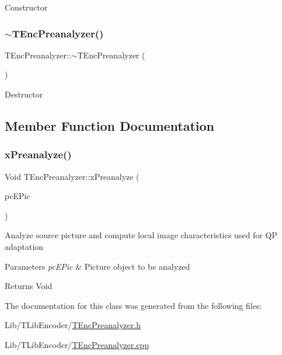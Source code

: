 Constructor \mbox{\label{class_t_enc_preanalyzer_a90121cb206a2f58a935386276f1484ea}} 
\subsubsection{\texorpdfstring{$\sim$\+T\+Enc\+Preanalyzer()}{~TEncPreanalyzer()}}
{\footnotesize\ttfamily T\+Enc\+Preanalyzer\+::$\sim$\+T\+Enc\+Preanalyzer (\begin{DoxyParamCaption}{ }\end{DoxyParamCaption})\hspace{0.3cm}{\ttfamily [virtual]}}

Destructor 

\subsection{Member Function Documentation}
\mbox{\label{class_t_enc_preanalyzer_a247b109224d0a34328debc40e06410d9}} 
\subsubsection{\texorpdfstring{x\+Preanalyze()}{xPreanalyze()}}
{\footnotesize\ttfamily Void T\+Enc\+Preanalyzer\+::x\+Preanalyze (\begin{DoxyParamCaption}\item[{\hyperlink{class_t_enc_pic}{T\+Enc\+Pic} $\ast$}]{pc\+E\+Pic }\end{DoxyParamCaption})}

Analyze source picture and compute local image characteristics used for QP adaptation 
\begin{DoxyParams}{Parameters}
{\em pc\+E\+Pic} & Picture object to be analyzed \\
\hline
\end{DoxyParams}
\begin{DoxyReturn}{Returns}
Void 
\end{DoxyReturn}


The documentation for this class was generated from the following files\+:\begin{DoxyCompactItemize}
\item 
Lib/\+T\+Lib\+Encoder/\hyperlink{_t_enc_preanalyzer_8h}{T\+Enc\+Preanalyzer.\+h}\item 
Lib/\+T\+Lib\+Encoder/\hyperlink{_t_enc_preanalyzer_8cpp}{T\+Enc\+Preanalyzer.\+cpp}\end{DoxyCompactItemize}
